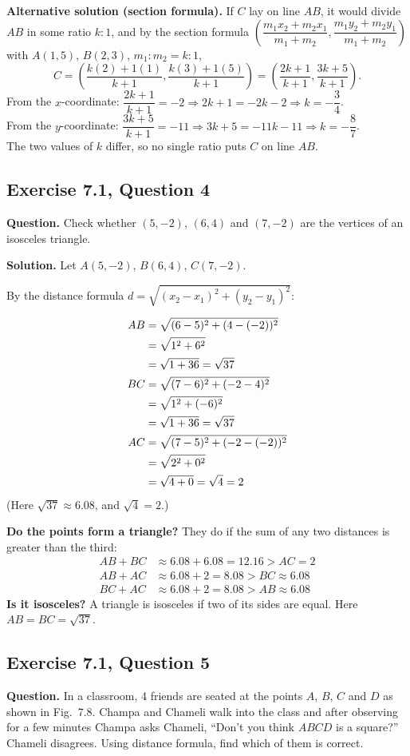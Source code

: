 \textbf{Alternative solution (section formula).} If $C$ lay on line $AB$, it would divide $AB$ in some ratio $k:1$, and by the section formula $\left(\dfrac{m_1x_2+m_2x_1}{m_1+m_2},\dfrac{m_1y_2+m_2y_1}{m_1+m_2}\right)$ with $A(1,5)$, $B(2,3)$, $m_1:m_2=k:1$,
\[C=\left(\frac{k(2)+1(1)}{k+1},\frac{k(3)+1(5)}{k+1}\right)=\left(\frac{2k+1}{k+1},\frac{3k+5}{k+1}\right).\]
From the $x$-coordinate: $\dfrac{2k+1}{k+1}=-2\Rightarrow 2k+1=-2k-2\Rightarrow k=-\dfrac34$.\\
From the $y$-coordinate: $\dfrac{3k+5}{k+1}=-11\Rightarrow 3k+5=-11k-11\Rightarrow k=-\dfrac87$.\\
The two values of $k$ differ, so no single ratio puts $C$ on line $AB$.


\subsection*{Exercise 7.1, Question 4}
\textbf{Question.} Check whether $(5,-2)$, $(6,4)$ and $(7,-2)$ are the vertices of an isosceles triangle.

\textbf{Solution.} Let $A(5,-2)$, $B(6,4)$, $C(7,-2)$.

By the distance formula $d=\sqrt{(x_2-x_1)^2+(y_2-y_1)^2}$:

\distnote
\begin{align*}
\distn{AB}{5}{-2}{6}{4}\\
\distn{BC}{6}{4}{7}{-2}\\
\dist{AC}{5}{-2}{7}{-2}{2}
\end{align*}
(Here $\sqrt{37}\approx6.08$, and $\sqrt4=2$.)

\textbf{Do the points form a triangle?} They do if the sum of any two distances is greater than the third:
\begin{align*}
AB+BC&\approx6.08+6.08=12.16>AC=2\\
AB+AC&\approx6.08+2=8.08>BC\approx6.08\\
BC+AC&\approx6.08+2=8.08>AB\approx6.08
\end{align*}
\textbf{Is it isosceles?} A triangle is isosceles if two of its sides are equal. Here $AB=BC=\sqrt{37}$.


\subsection*{Exercise 7.1, Question 5}
\textbf{Question.} In a classroom, 4 friends are seated at the points $A$, $B$, $C$ and $D$ as shown in Fig.\ 7.8. Champa and Chameli walk into the class and after observing for a few minutes Champa asks Chameli, ``Don't you think $ABCD$ is a square?'' Chameli disagrees. Using distance formula, find which of them is correct.

